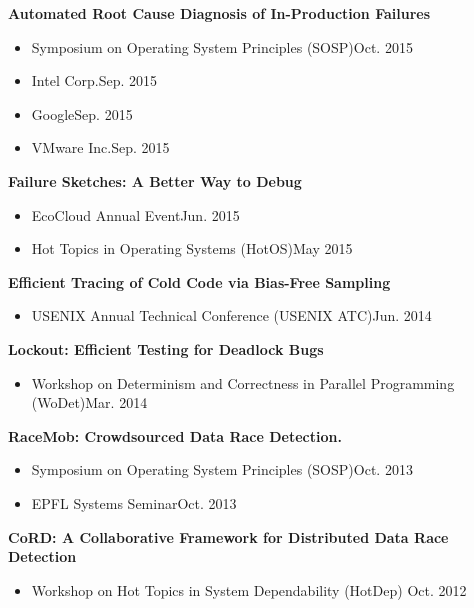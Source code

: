 \documentclass[10pt]{article}
\newcommand{\mysub}[3]{\textbf{#1} {#2} \hfill {\em #3}}
\begin{document}
\mysub{Automated Root Cause Diagnosis of In-Production Failures}{}{} 
\vspace{-2mm}
\begin{itemize}
\setlength\itemsep{0em}
\item{Symposium on Operating System Principles (SOSP)}\hfill Oct. 2015
\item{Intel Corp.}\hfill Sep. 2015
\item{Google}\hfill Sep. 2015
\item{VMware Inc.}\hfill Sep. 2015
\end{itemize}


\mysub{Failure Sketches: A Better Way to Debug}{}{} 
\vspace{-2mm}
\begin{itemize}
\setlength\itemsep{0em}
\item{EcoCloud Annual Event}\hfill Jun. 2015
\item{Hot Topics in Operating Systems (HotOS)}\hfill May 2015
\end{itemize}


\mysub{Efficient Tracing of Cold Code via Bias-Free Sampling}{}{} 
\vspace{-2mm}
\begin{itemize}
\setlength\itemsep{0em}
\item{USENIX Annual Technical Conference (USENIX ATC)}\hfill Jun. 2014
\end{itemize}


\mysub{Lockout: Efficient Testing for Deadlock Bugs}{}{} 
\vspace{-2mm}
\begin{itemize}
\setlength\itemsep{0em}
\item{Workshop on Determinism and Correctness in Parallel Programming (WoDet)}\hfill Mar. 2014
\end{itemize}

\mysub{RaceMob: Crowdsourced Data Race Detection.}{}{} 
\vspace{-2mm}
\begin{itemize}
\setlength\itemsep{0em}
\item{Symposium on Operating System Principles (SOSP)}\hfill Oct. 2013
\item{EPFL Systems Seminar}\hfill Oct. 2013
\end{itemize}

\mysub{CoRD: A Collaborative Framework for Distributed Data Race Detection}{}{} 
\vspace{-2mm}
\begin{itemize}
\setlength\itemsep{0em}
\item{Workshop on Hot Topics in System Dependability (HotDep)} \hfill Oct. 2012
\end{itemize}
\end{document}
